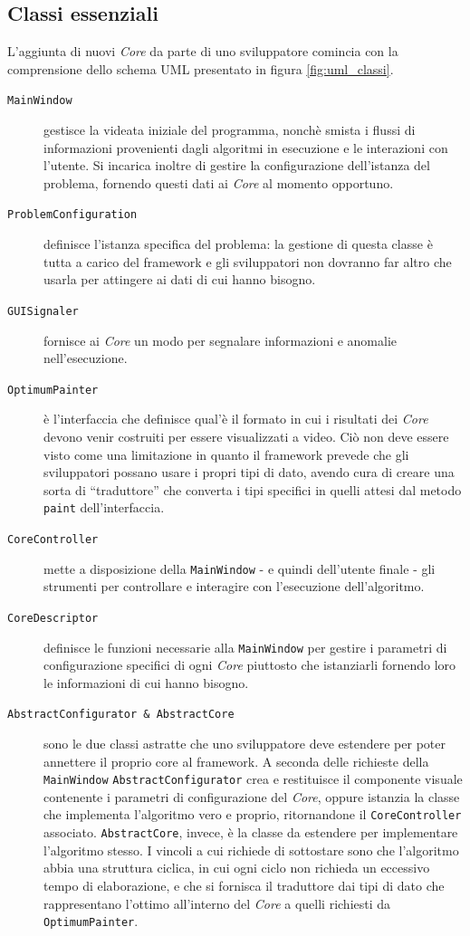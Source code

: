 \subsection{Classi essenziali}
L'aggiunta di nuovi \emph{Core} da parte di uno sviluppatore comincia con la comprensione dello schema UML presentato in figura \ref{fig:uml_classi}.
\begin{description}
	\item[\texttt{MainWindow}] gestisce la videata iniziale del programma, nonchè smista i flussi di informazioni provenienti dagli algoritmi in esecuzione e le interazioni con l'utente. Si incarica inoltre di gestire la configurazione dell'istanza del problema, fornendo questi dati ai \emph{Core} al momento opportuno.
	\item[\texttt{ProblemConfiguration}] definisce l'istanza specifica del problema: la gestione di questa classe è tutta a carico del framework e gli sviluppatori non dovranno far altro che usarla per attingere ai dati di cui hanno bisogno.
	\item[\texttt{GUISignaler}] fornisce ai \emph{Core} un modo per segnalare informazioni e anomalie nell'esecuzione.
	\item[\texttt{OptimumPainter}] è l'interfaccia che definisce qual'è il formato in cui i risultati dei \emph{Core} devono venir costruiti per essere visualizzati a video. Ciò non deve essere visto come una limitazione in quanto il framework prevede che gli sviluppatori possano usare i propri tipi di dato, avendo cura di creare una sorta di ``traduttore'' che converta i tipi specifici in quelli attesi dal metodo \texttt{paint} dell'interfaccia.
	\item[\texttt{CoreController}] mette a disposizione della \texttt{MainWindow} - e quindi dell'utente finale - gli strumenti per controllare e interagire con l'esecuzione dell'algoritmo.
	\item[\texttt{CoreDescriptor}] definisce le funzioni necessarie alla \texttt{MainWindow} per gestire i parametri di configurazione specifici di ogni \emph{Core} piuttosto che istanziarli fornendo loro le informazioni di cui hanno bisogno.
	\item[\texttt{AbstractConfigurator \& AbstractCore}] sono le due classi astratte che uno sviluppatore deve estendere per poter annettere il proprio core al framework. A seconda delle richieste della \texttt{MainWindow} \texttt{AbstractConfigurator} crea e restituisce il componente visuale contenente i parametri di configurazione del \emph{Core}, oppure istanzia la classe che implementa l'algoritmo vero e proprio, ritornandone il \texttt{CoreController} associato. \texttt{AbstractCore}, invece, è la classe da estendere per implementare l'algoritmo stesso. I vincoli a cui richiede di sottostare sono che l'algoritmo abbia una struttura ciclica, in cui ogni ciclo non richieda un eccessivo tempo di elaborazione, e che si fornisca il traduttore dai tipi di dato che rappresentano l'ottimo all'interno del \emph{Core} a quelli richiesti da \texttt{OptimumPainter}.
\end{description}


